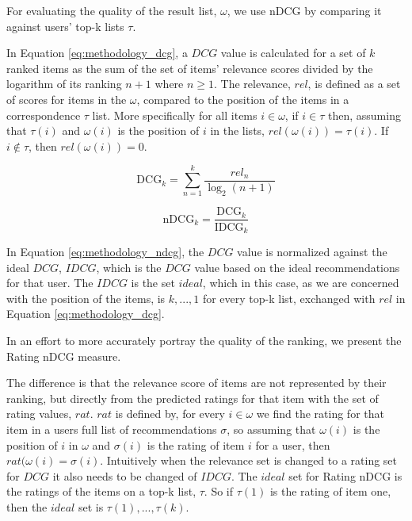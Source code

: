 \label{sec:methodology_ndcg}
For evaluating the quality of the result list, $\omega$, we use nDCG by comparing it against users' top-k lists $\tau$. 

In Equation \ref{eq:methodology_dcg}, a $DCG$ value is calculated for a set of $k$ ranked items as the sum of the set of items' relevance scores divided by the logarithm of its ranking $n + 1$ where $n \geq 1$. The relevance, $rel$, is defined as a set of scores for items in the $\omega$, compared to the position of the items in a correspondence $\tau$ list. More specifically for all items $i \in \omega$, if $i \in \tau$ then, assuming that $\tau(i)$ and $\omega(i)$ is the position of $i$ in the lists, $rel(\omega(i)) = \tau(i)$. If $i \notin \tau$, then $rel(\omega(i)) = 0$.


\begin{equation}\label{eq:methodology_dcg}
\text{DCG}_k = \sum_{n=1}^{k}\frac{\textit{rel}_n}{\log_2(n + 1)}
\end{equation}




\begin{equation}\label{eq:methodology_ndcg}
\text{nDCG}_k = \frac{\text{DCG}_k}{\text{IDCG}_k}
\end{equation}

In Equation \ref{eq:methodology_ndcg}, the $DCG$ value is normalized against the ideal $DCG$, $IDCG$, which is the $DCG$ value based on the ideal recommendations for that user. The $IDCG$ is the set $ideal$, which in this case, as we are concerned with the position of the items, is $k,...,1$ for every top-k list, exchanged with $rel$ in Equation \ref{eq:methodology_dcg}. 

In an effort to more accurately portray the quality of the ranking, we present the Rating nDCG measure.

The difference is that the relevance score of items are not represented by their ranking, but directly from the predicted ratings for that item with the set of rating values, $rat$. $rat$ is defined by, for every $i\in \omega$ we find the rating for that item in a users full list of recommendations $\sigma$, so assuming that $\omega(i)$ is the position of $i$ in $\omega$ and $\sigma(i)$ is the rating of item $i$ for a user, then $rat(\omega(i) = \sigma(i)$.
Intuitively when the relevance set is changed to a rating set for $DCG$ it also needs to be changed of $IDCG$. The $ideal$ set for Rating nDCG is the ratings of the items on a top-k list, $\tau$. So if $\tau(1)$ is the rating of item one, then the $ideal$ set is $\tau(1),...,\tau(k)$.

